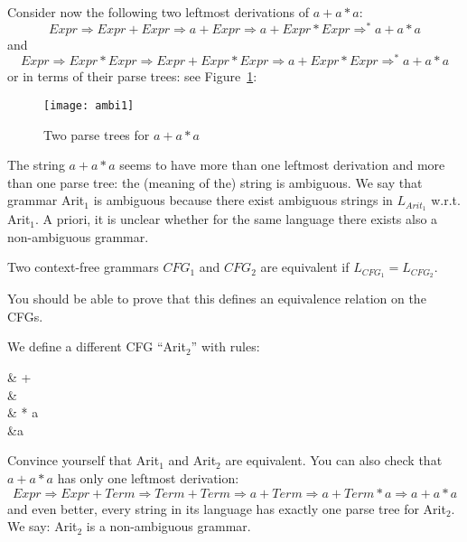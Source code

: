 Consider now the following two leftmost derivations of $a+a*a$:
\begin{equation*}
	Expr \Rightarrow Expr + Expr \Rightarrow a + Expr \Rightarrow a + Expr * Expr \Rightarrow^* a + a * a
\end{equation*}
and
\begin{equation*}
	Expr \Rightarrow Expr * Expr \Rightarrow Expr + Expr * Expr  \Rightarrow a + Expr * Expr \Rightarrow^* a + a * a
\end{equation*}
or in terms of their parse trees: see Figure~\ref{ambi1}:

\begin{figure}[h]
\centering
\texttt{[image: ambi1]}
\caption{Two parse trees for $a+a*a$\label{ambi1}}
\end{figure}

The string $a+a*a$ seems to have more than one leftmost derivation and
more than one parse tree: the (meaning of the) string is ambiguous.
We say that grammar Arit${}_1$ is ambiguous because there exist ambiguous
strings in $L_{Arit_1}$ w.r.t. Arit${}_1$. A priori, it is unclear whether
for the same language there exists also a non-ambiguous grammar.

\begin{definition}
Two context-free grammars $CFG_1$ and $CFG_2$ are equivalent if $L_{CFG_1} = L_{CFG_2}$.
\end{definition}

You should be able to prove that this defines an equivalence relation
on the CFGs.

We define a different CFG ``Arit${}_2$'' with rules:
\begin{grammar}\label{arit2label}
  &\rpijl {} +  \\
  &\rpijl {} \\
  &\rpijl {} * a \\
  &\rpijl a
\end{grammar}
Convince yourself that Arit${}_1$ and Arit${}_2$ are equivalent. You can also check that $a+a*a$ has only one leftmost derivation:
\begin{equation*}
	Expr \Rightarrow Expr + Term \Rightarrow Term + Term \Rightarrow a + Term \Rightarrow a + Term * a \Rightarrow a + a * a
\end{equation*}
and even better, every string in its language has exactly one parse
tree for Arit${}_2$. We say: Arit${}_2$ is a non-ambiguous grammar.

